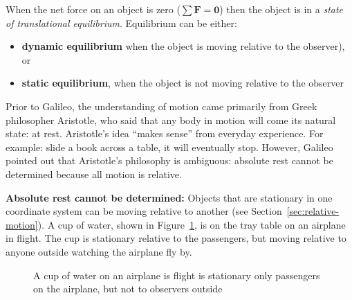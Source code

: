When the net force on an object is zero ($\sum\bm F=\bm 0$) then the
object is in a \emph{state of translational equilibrium}. Equilibrium can be
either:
\begin{itemize}[itemsep=6pt]
\item\textbf{dynamic equilibrium} when the object is moving relative to the
  observer), or
\item\textbf{static equilibrium}, when the object is not moving relative to the
  observer
\end{itemize}


Prior to Galileo, the understanding of motion came primarily from Greek
philosopher Aristotle, who said that any body in motion will come its natural
state: at rest. Aristotle's idea ``makes sense'' from everyday experience. For
example: slide a book across a table, it will eventually stop. However, Galileo
pointed out that Aristotle's philosophy is ambiguous: absolute rest cannot be
determined because all motion is relative.

\textbf{Absolute rest cannot be determined:} Objects that are stationary in one
coordinate system can be moving relative to another (see
Section~\ref{sec:relative-motion}). A cup of water, shown in Figure~\ref{fig:cup},
is on the tray table on an airplane in flight. The cup is stationary relative
to the passengers, but moving relative to anyone outside watching the airplane
fly by.
\begin{figure}[ht]
  \centering
  \caption{A cup of water on an airplane is flight is stationary only
    passengers on the airplane, but not to observers outside}
  \label{fig:cup}
\end{figure}

